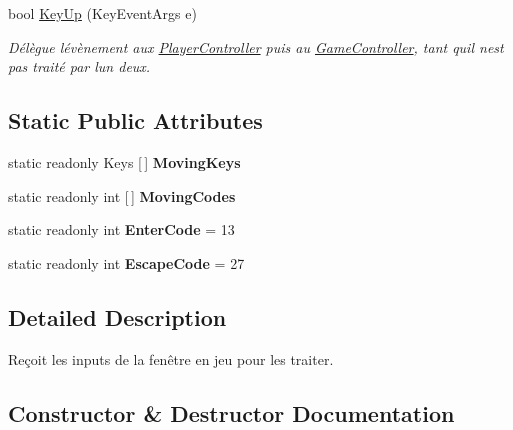 \begin{DoxyCompactItemize}
bool \hyperlink{class_tentacle_slicers_1_1inputs_1_1_input_handler_a828d7294af3ca64820101d343983da5b}{Key\+Up} (Key\+Event\+Args e)
\begin{DoxyCompactList}\small\item\em Délègue l\textquotesingle{}évènement aux \hyperlink{class_tentacle_slicers_1_1inputs_1_1_player_controller}{Player\+Controller} puis au \hyperlink{class_tentacle_slicers_1_1inputs_1_1_game_controller}{Game\+Controller}, tant qu\textquotesingle{}il n\textquotesingle{}est pas traité par l\textquotesingle{}un d\textquotesingle{}eux. \end{DoxyCompactList}\end{DoxyCompactItemize}
\subsection*{Static Public Attributes}
\begin{DoxyCompactItemize}
\item 
static readonly Keys \mbox{[}$\,$\mbox{]} {\bfseries Moving\+Keys}
\item 
static readonly int \mbox{[}$\,$\mbox{]} {\bfseries Moving\+Codes}
\item 
\mbox{\label{class_tentacle_slicers_1_1inputs_1_1_input_handler_a0fc7734438c26c1a29a23435cf2eea0a}} 
static readonly int {\bfseries Enter\+Code} = 13
\item 
\mbox{\label{class_tentacle_slicers_1_1inputs_1_1_input_handler_a54d1bdccad7c5afe4d64706fb1b4e50b}} 
static readonly int {\bfseries Escape\+Code} = 27
\end{DoxyCompactItemize}


\subsection{Detailed Description}
Reçoit les inputs de la fenêtre en jeu pour les traiter. 



\subsection{Constructor \& Destructor Documentation}
\mbox{\label{class_tentacle_slicers_1_1inputs_1_1_input_handler_a7c9bfb4948b863cf8499d5142b622f32}} 
